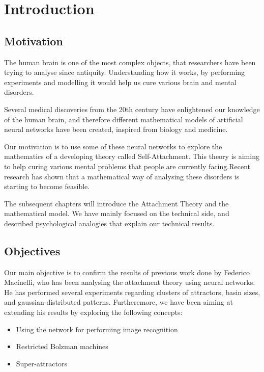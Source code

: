 \chapter{Introduction}

\section{Motivation}
The human brain is one of the most complex objects, that researchers have been trying to analyse since antiquity. Understanding how it works, by performing experiments and modelling it would help us cure various brain and mental disorders. 

Several medical discoveries from the 20th century have enlightened our knowledge of the human brain, and therefore different mathematical models of artificial neural networks have been created, inspired from biology and medicine. 

Our motivation is to use some of these neural networks to explore the mathematics of a developing theory called Self-Attachment. This theory is aiming to help curing various mental problems that people are currently facing.Recent research has shown that a mathematical way of analysing these disorders is starting to become feasible. \cite{net_model_neuroses}

The subsequent chapters will introduce the Attachment Theory and the mathematical model. We have mainly focused on the technical side, and described  psychological analogies that explain our technical results. 

\section{Objectives}

Our main objective is to confirm the results of previous work done by Federico Macinelli, who has been analysing the attachment theory using neural networks. He has performed several experiments regarding clusters of attractors, basin sizes, and gaussian-distributed patterns. Furtheremore, we have been aiming at extending his results by exploring the following concepts:
\begin{itemize}
\item Using the network for performing image recognition
\item Restricted Bolzman machines
\item Super-attractors
\end{itemize}


